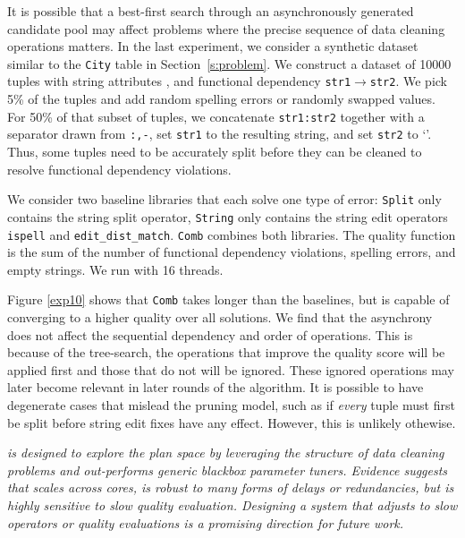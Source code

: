 It is possible that a best-first search through an asynchronously generated candidate pool may affect problems where the precise sequence of data cleaning operations matters.
In the last experiment, we consider a synthetic dataset similar to the \texttt{City} table in Section~\ref{s:problem}.  
We construct a dataset of 10000 tuples with string attributes , and functional dependency \texttt{str1$\rightarrow$str2}.  We pick 5\% of the tuples and add random spelling errors or randomly swapped values. For 50\% of that subset of tuples, we concatenate \texttt{str1:str2} together with a separator drawn from \texttt{:,-}, set \texttt{str1} to the resulting string, and set \texttt{str2} to `'.  Thus, some tuples need to be accurately split before they can be cleaned to resolve functional dependency violations.

We consider two baseline libraries that each solve one type of error: \texttt{Split} only contains the string split operator, \texttt{String} only contains the string edit operators \texttt{ispell} and \texttt{edit\_dist\_match}.  \texttt{Comb} combines both libraries.  The quality function is the sum of the number of functional dependency violations, spelling errors, and empty strings.  We run \sys with 16 threads.

Figure \ref{exp10} shows that \texttt{Comb} takes longer than the baselines, but is capable of converging to a higher quality over all solutions.
We find that the asynchrony does not affect the sequential dependency and order of operations.
This is because of the tree-search, the operations that improve the quality score will be applied first and those that do not will be ignored.
These ignored operations may later become relevant in later rounds of the algorithm.  It is possible to have degenerate cases that mislead the pruning model, such as if {\it every} tuple must first be split before string edit fixes have any effect.  However, this is unlikely othewise.

{\it {} \sys is designed to explore the plan space by leveraging the structure of data cleaning problems and out-performs generic blackbox parameter tuners.  Evidence suggests that \sys scales across cores, is robust to many forms of delays or redundancies, but is highly sensitive to slow quality evaluation.  Designing a system that adjusts to slow operators or quality evaluations is a promising direction for future work.}

